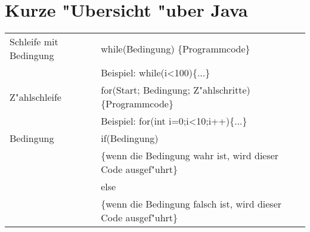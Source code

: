 \section{Kurze "Ubersicht "uber Java}
	\begin{table}[h]
		\renewcommand{\arraystretch}{1.5}
		\begin{center}
			\begin{tabular}{|p{}|p{}|}
				\hline
				Schleife mit Bedingung& while(Bedingung) \{Programmcode\} \tabularnewline
				\space & \scriptsize Beispiel: while(i<100)\{...\} \tabularnewline
				\hline
				Z"ahlschleife& for(Start; Bedingung; Z"ahlschritte) \{Programmcode\} \tabularnewline
				\space & \scriptsize Beispiel: for(int i=0;i<10;i++)\{...\} \tabularnewline
				\hline
				Bedingung& if(Bedingung) \tabularnewline
				\space& \{wenn die Bedingung wahr ist, wird dieser Code ausgef"uhrt\} \tabularnewline
				\space & else \tabularnewline
				\space & \{wenn die Bedingung falsch ist, wird dieser Code ausgef"uhrt\}
				\tabularnewline
				\hline			
			\end{tabular}
		\end{center}
	\end{table}
	